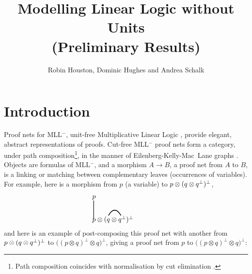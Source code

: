 \documentclass{robincs}
\author{Robin Houston, Dominic Hughes and Andrea Schalk}
\title{Modelling Linear Logic without Units\\(Preliminary Results)}
\newcommand\mll  {MLL$^-$\xspace}
\renewcommand\perp{^\bot}
\newcommand\dual[1]{#1\perp}
\newlength{\tw}\setlength{\tw}{\textwidth}\addtolength{\tw}{-\arrayrulewidth}
\begin{document}
\maketitle

\section{Introduction}\label{intro}

Proof nets for \mll, unit-free Multiplicative Linear Logic
\citep{Girard87}, provide elegant, abstract representations of
proofs.
%
Cut-free \mll proof nets form a category, under path
composition\footnote{Path composition coincides with
normalisation by cut elimination \citep{Girard87}.}, in the manner of
Eilenberg-Kelly-Mac~Lane graphs \citep{EK66,KM71}.
%
Objects are formulas of \mll, and a morphism $A\to B$, a proof
net from $A$ to $B$, is a linking or matching between complementary
leaves (occurrences of variables).  For example, here is a morphism
from $p$ (a variable) to $p\otimes (q\tensor \dual{q})\perp$,
\[\thicklines
\begin{array}{l@{\hspace{10ex}}l}
        p\begin{picture}(0,0)\put(-3,-3){\line(0,-1){27}}\end{picture}
        \\[5ex]
        p\otimes(q%
        \begin{picture}(0,0)%
                \put(-2,9){\qbezier(0,0)(9,15)(18,0)}%
        \end{picture}%
        \otimes \dual{q})\perp
\end{array}\]
and here is an example of post-composing this proof net with another
from $p\otimes (q\tensor \dual{q})\perp$ to $\big((p\otimes
q)\perp\otimes q\big)\perp$, giving a proof net from $p$ to
$\big((p\otimes q)\perp\otimes q\big)\perp$:
%
\end{document}
